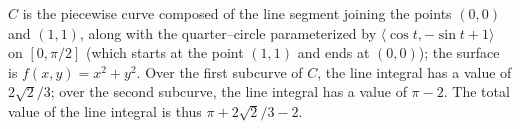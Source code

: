 {$C$ is the piecewise curve composed of the line segment joining the points $(0,0)$ and $(1,1)$, along with the quarter--circle parameterized by $\langle \cos t,-\sin t+1\rangle$ on $[0,\pi/2]$ (which starts at the point $(1,1)$ and ends at $(0,0)$); the surface is $f(x,y)=x^2+y^2$.
}
{Over the first subcurve of $C$, the line integral has a value of $2\sqrt{2}/3$; over the second subcurve, the line integral has a value of $\pi-2$. The total value of the line integral is thus $\pi+2\sqrt{2}/3-2$.
}
